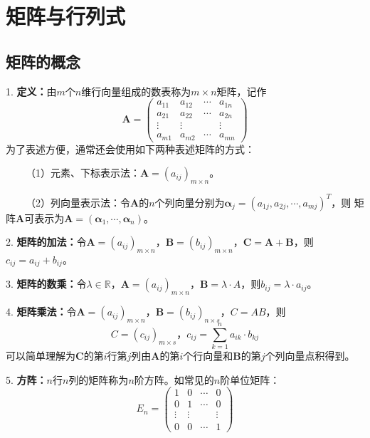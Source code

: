 \section{矩阵与行列式}

\subsection{矩阵的概念}

1. \textbf{定义：}由$m$个$n$维行向量组成的数表称为$m\times n$矩阵，记作
\begin{equation*}
    \boldsymbol{A}=\begin{pmatrix}
        a_{11}&a_{12}&\cdots&a_{1n}\\
        a_{21}&a_{22}&\cdots&a_{2n}\\
        \vdots&\vdots&&\vdots\\
        a_{m1}&a_{m2}&\cdots&a_{mn}
    \end{pmatrix}
\end{equation*}
为了表述方便，通常还会使用如下两种表述矩阵的方式：

~~~~（1）元素、下标表示法：$\boldsymbol{A}=(a_{ij})_{m\times n}$。

~~~~（2）列向量表示法：令$\boldsymbol{A}$的$n$个列向量分别为$\boldsymbol{\alpha}_j=(a_{1j},a_{2j},\cdots,a_{mj})^T$，则
矩阵$\boldsymbol{A}$可表示为$\boldsymbol{A}=(\boldsymbol{\alpha}_1,\cdots,\boldsymbol{\alpha}_n)$。

2. \textbf{矩阵的加法：}令$\boldsymbol{A}=(a_{ij})_{m\times n}$，$\boldsymbol{B}=(b_{ij})_{m\times n}$，$\boldsymbol{C}=\boldsymbol{A}+\boldsymbol{B}$，则$c_{ij}=a_{ij}+b_{ij}$。

3. \textbf{矩阵的数乘：}令$\lambda \in \mathbb{R}$，$\boldsymbol{A}=(a_{ij})_{m\times n}$，$\boldsymbol{B}=\lambda \cdot A$，则$b_{ij}=\lambda \cdot a_{ij}$。

4. \textbf{矩阵乘法：}令$\boldsymbol{A}=(a_{ij})_{m\times n}$，$\boldsymbol{B}=(b_{ij})_{n\times s}$，$C=AB$，则
\begin{equation*}
    C=(c_{ij})_{m\times s}\text{，}c_{ij}=\sum\limits_{k=1}^n a_{ik}\cdot b_{kj}
\end{equation*}
可以简单理解为$\boldsymbol{C}$的第$i$行第$j$列由$\boldsymbol{A}$的第$i$个行向量和$\boldsymbol{B}$的第$j$个列向量点积得到。

5. \textbf{方阵：}$n$行$n$列的矩阵称为$n$阶方阵。如常见的$n$阶单位矩阵：
\begin{equation*}
    E_n=\begin{pmatrix}
        1&0&\cdots&0\\
        0&1&\cdots&0\\
        \vdots&\vdots&&\vdots\\
        0&0&\cdots&1
    \end{pmatrix}
\end{equation*}

